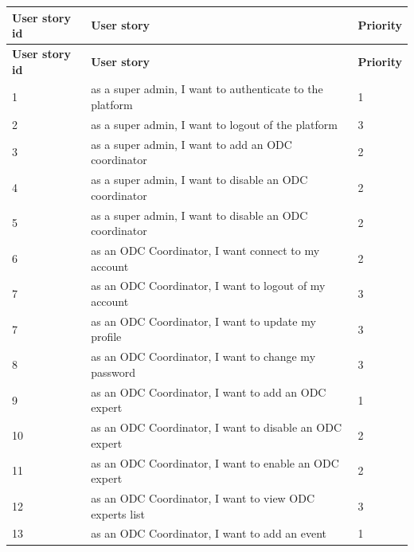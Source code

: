 \begin{longtable}{|l|l|l|}
      \hline
      \textbf{User story id} & \textbf{User story}                                      & \textbf{Priority} \\ \hline
      \endfirsthead
      \hline
      \textbf{User story id} & \textbf{User story}                                      & \textbf{Priority} \\ \hline
      \endhead
      \endlastfoot
      1                      & as a super admin, I want to authenticate to the platform & 1                 \\ \hline
      2                      & as a super admin, I want to logout of the platform       & 3                 \\ \hline
      3                      & as a super admin, I want to add an ODC coordinator       & 2                 \\ \hline
      4                      & as a super admin, I want to disable an ODC coordinator   & 2                 \\ \hline
      5                      & as a super admin, I want to disable an ODC coordinator   & 2                 \\ \hline
      6                      & as an ODC Coordinator, I want connect to my account      & 2                 \\ \hline
      7                      & as an ODC Coordinator, I want to logout of my account    & 3                 \\ \hline
      7                      & as an ODC Coordinator, I want to update my profile       & 3                 \\ \hline
      8                      & as an ODC Coordinator, I want to change my password      & 3                 \\ \hline
      9                      & as an ODC Coordinator, I want to add an ODC expert       & 1                 \\ \hline
      10                     & as an ODC Coordinator, I want to disable an ODC expert   & 2                 \\ \hline
      11                     & as an ODC Coordinator, I want to enable an ODC expert    & 2                 \\ \hline
      12                     & as an ODC Coordinator, I want to view ODC experts list   & 3                 \\ \hline
      13                     & as an ODC Coordinator, I want to add an event            & 1                 \\ \hline

\end{longtable}
